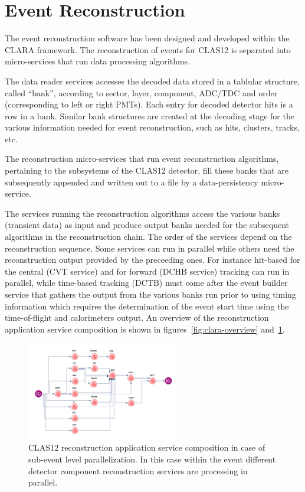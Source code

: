 \section{Event Reconstruction}
The event reconstruction software has been designed and developed within the CLARA framework.
The reconstruction of events for CLAS12 is separated into micro-services that run data processing algorithms.

The data reader services accesses the decoded data stored in a tablular structure,
called ``bank'', according to
sector, layer, component, ADC/TDC and order (corresponding to left or right PMTs). Each entry for decoded
detector hits is a row in a bank.  Similar bank structures are created at the decoding stage for the
various information needed for event reconstruction, such as hits, clusters, tracks, etc.

The reconstruction micro-services that run event reconstruction algorithms, pertaining to
the subsystems of the CLAS12 detector, fill these banks
that are subsequently appended and written out to a file by a data-persistency micro-service.

The services running the reconstruction algorithms access the various banks (transient data) as input
and produce output banks needed for the subsequent algorithms in the reconstruction chain.
The order of the services depend on the reconstruction sequence.  Some services can run in parallel while others
need the reconstruction output provided by the preceeding ones.
For instance hit-based for the central (CVT service) and for forward (DCHB service) tracking
can run in parallel, while time-based tracking (DCTB) must come after the event builder service
that gathers the output from the various banks run prior to using timing information which requires
the determination of the event start time using the time-of-flight and calorimeters output.
An  overview of the reconstruction application service composition is shown in figures~\ref{fig:clara-overview} and~\ref{fig:services}.



\begin{figure}
\centering
\includegraphics[width=0.6\textwidth]{pics/ServiceComposition.png}
\caption{CLAS12 reconstruction application service composition in case of sub-event level parallelization.
In this case within the event different detector component reconstruction services are processing in parallel.}
\label{fig:services}
\end{figure}


